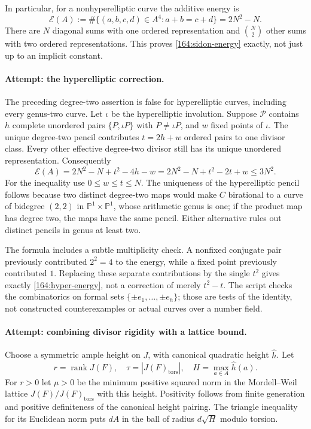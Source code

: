 \documentclass[11pt,a4paper]{article}
\newcommand{\PP}{\mathbb P}
\numberwithin{equation}{section}
\begin{document}
In particular, for a nonhyperelliptic curve the additive energy is
\begin{equation}\label{164:sidon-energy}
 \mathcal E(A):=\#\{(a,b,c,d)\in A^4:a+b=c+d\}=2N^2-N.
\end{equation}
There are $N$ diagonal sums with one ordered representation and
$\binom N2$ other sums with two ordered representations. This proves
\eqref{164:sidon-energy} exactly, not just up to an implicit constant.

\paragraph{Attempt: the hyperelliptic correction.}
The preceding degree-two assertion is false for hyperelliptic curves,
including every genus-two curve. Let $\iota$ be the hyperelliptic
involution. Suppose $\mathcal P$ contains $h$ complete unordered pairs
$\{P,\iota P\}$ with $P\ne\iota P$, and $w$ fixed points of $\iota$.
The unique degree-two pencil contributes
$t=2h+w$ ordered pairs to one divisor class. Every other effective
degree-two divisor still has its unique unordered representation.
Consequently
\begin{equation}\label{164:hyper-energy}
 \mathcal E(A)=2N^2-N+t^2-4h-w
             =2N^2-N+t^2-2t+w\le3N^2.
\end{equation}
For the inequality use $0\le w\le t\le N$. The uniqueness of the
hyperelliptic pencil follows because two distinct degree-two maps would
make $C$ birational to a curve of bidegree $(2,2)$ in
$\PP^1\times\PP^1$, whose arithmetic genus is one; if the product map
has degree two, the maps have the same pencil. Either alternative rules
out distinct pencils in genus at least two.

The formula includes a subtle multiplicity check. A nonfixed conjugate
pair previously contributed $2^2=4$ to the energy, while a fixed point
previously contributed $1$. Replacing these separate contributions by
the single $t^2$ gives exactly \eqref{164:hyper-energy}, not a correction
of merely $t^2-t$. The script checks the combinatorics on formal sets
$\{\pm e_1,\ldots,\pm e_h\}$; those are tests of the identity, not
constructed counterexamples or actual curves over a number field.

\paragraph{Attempt: combining divisor rigidity with a lattice bound.}
Choose a symmetric ample height on $J$, with canonical quadratic height
$\widehat h$. Let
\[
 r=\operatorname{rank}J(F),\quad
 \tau=|J(F)_{\mathrm{tors}}|,\quad
 H=\max_{a\in A}\widehat h(a).
\]
For $r>0$ let $\mu>0$ be the minimum positive squared norm in the
Mordell--Weil lattice $J(F)/J(F)_{\mathrm{tors}}$ with this height.
Positivity follows from finite generation and positive definiteness of
the canonical height pairing. The triangle inequality for its Euclidean
norm puts $dA$ in the ball of radius $d\sqrt H$ modulo torsion.
\end{document}
